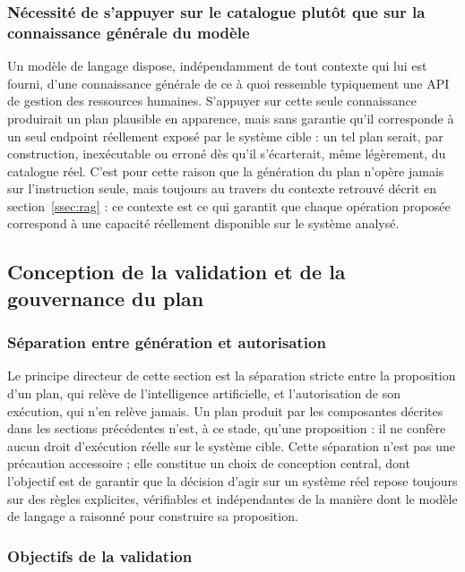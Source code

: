 \subsubsection{Nécessité de s'appuyer sur le catalogue plutôt que sur la connaissance générale du modèle}

Un modèle de langage dispose, indépendamment de tout contexte qui lui est fourni, d'une connaissance générale de ce à quoi ressemble typiquement une API de gestion des ressources humaines. S'appuyer sur cette seule connaissance produirait un plan plausible en apparence, mais sans garantie qu'il corresponde à un seul endpoint réellement exposé par le système cible : un tel plan serait, par construction, inexécutable ou erroné dès qu'il s'écarterait, même légèrement, du catalogue réel. C'est pour cette raison que la génération du plan n'opère jamais sur l'instruction seule, mais toujours au travers du contexte retrouvé décrit en section~\ref{ssec:rag} : ce contexte est ce qui garantit que chaque opération proposée correspond à une capacité réellement disponible sur le système analysé.

\subsection{Conception de la validation et de la gouvernance du plan}
\label{ssec:validation-gouvernance}

\subsubsection{Séparation entre génération et autorisation}

Le principe directeur de cette section est la séparation stricte entre la proposition d'un plan, qui relève de l'intelligence artificielle, et l'autorisation de son exécution, qui n'en relève jamais. Un plan produit par les composantes décrites dans les sections précédentes n'est, à ce stade, qu'une proposition : il ne confère aucun droit d'exécution réelle sur le système cible. Cette séparation n'est pas une précaution accessoire ; elle constitue un choix de conception central, dont l'objectif est de garantir que la décision d'agir sur un système réel repose toujours sur des règles explicites, vérifiables et indépendantes de la manière dont le modèle de langage a raisonné pour construire sa proposition.

\subsubsection{Objectifs de la validation}

